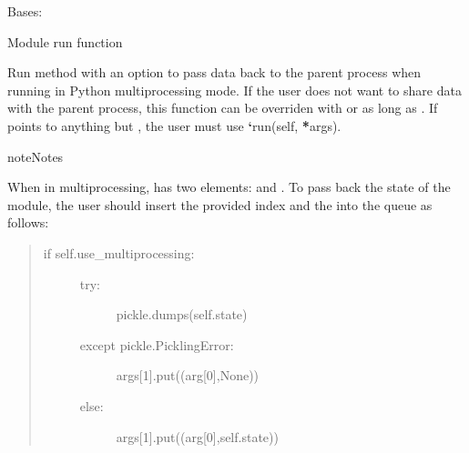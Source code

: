 \documentclass[letterpaper,10pt,openany,oneside,english]{sphinxmanual}
\begin{document}
\begin{fulllineitems}
\label{\detokenize{examples_rst/dummy_module:dummy_module.DummyModule2}}
Bases: 

\begin{fulllineitems}
\label{\detokenize{examples_rst/dummy_module:dummy_module.DummyModule2.run}}
Module run function

Run method with an option to pass data back to the parent process when running
in Python multiprocessing mode. If the user does not want to share data with
the parent process, this function can be overriden with 
or  as long as .
If  points to anything but , the user must use
{\color{red}\bfseries{}{}`}run(self, {\color{red}\bfseries{}*}args).

\begin{sphinxadmonition}{note}{Notes}

When in multiprocessing,  has two elements:  and .
To pass back the state of the module, the user should insert the provided
index  and the  into the queue as follows:
\begin{quote}
\begin{description}
\item[{if self.use\_multiprocessing:}] \leavevmode\begin{description}
\item[{try:}] \leavevmode
pickle.dumps(self.state)

\item[{except pickle.PicklingError:}] \leavevmode
args{[}1{]}.put((arg{[}0{]},None))

\item[{else:}] \leavevmode
args{[}1{]}.put((arg{[}0{]},self.state))

\end{description}

\end{description}
\end{quote}


\end{sphinxadmonition}
\end{fulllineitems}
\end{fulllineitems}
\end{document}
